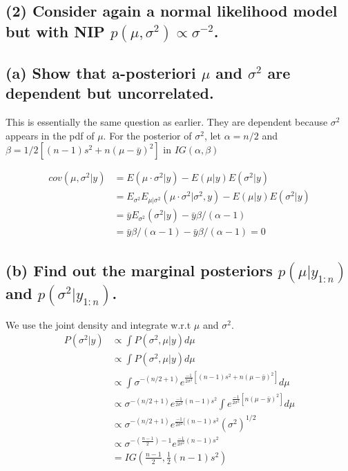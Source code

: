 \documentclass[11pt]{article}
\begin{document}
\subsection*{(2) Consider again a normal likelihood model but with NIP $p(\mu, \sigma^2) \propto \sigma^{-2}$.}



\subsection*{(a) Show that a-posteriori $\mu$ and $\sigma^2$ are dependent but uncorrelated.}



This is essentially the same question as earlier. They are dependent because $\sigma^2$ appears in the pdf of $\mu$. For the posterior of $\sigma^2$, let $\alpha = n/2$ and $\beta = 1/2[(n-1)s^2 + n(\mu - \bar{y})^2]$ in $IG(
\alpha, \beta)$

\begin{align*}
    cov(\mu, \sigma^2|y) &= E(\mu \cdot \sigma^2|y) -  E(\mu|y)E(\sigma^2|y)\\
    &= E_{\sigma^2}E_{\mu|\sigma^2}(\mu \cdot \sigma^2|\sigma^2, y) -  E(\mu|y)E(\sigma^2|y)\\
    &=\bar{y} E_{\sigma^2}  (\sigma^2|y) - \bar{y}\beta/(\alpha - 1)\\
    &= \bar{y}\beta/(\alpha - 1) - \bar{y}\beta/(\alpha - 1) = 0
\end{align*}

\subsection*{(b) Find out the marginal posteriors $p(\mu |y_{1:n})$ and $p(\sigma^2 |y_{1:n})$.}

We use the joint density and integrate w.r.t $\mu$ and $\sigma^2$.
\begin{align*}
    P(\sigma^2|y) &\propto \int P(\sigma^2, \mu|y)d\mu \\
    &\propto \int P(\sigma^2, \mu|y)d\mu \\
    &\propto \int \sigma^{-(n/2 + 1)}e^{\frac{-1}{2\sigma^2}[(n-1)s^2+n(\mu-\bar{y})^2]}d\mu \\
    &\propto \sigma^{-(n/2 + 1)}e^{\frac{-1}{2\sigma^2}(n-1)s^2} \int e^{\frac{-1}{2\sigma^2}[n(\mu-\bar{y})^2]}d\mu \\
     &\propto \sigma^{-(n/2 + 1)}e^{\frac{-1}{2\sigma^2}[(n-1)s^2} (\sigma^2)^{1/2} \\
     &\propto \sigma^{-\left(\frac{n-1}{2}\right)- 1}e^{\frac{-1}{2\sigma^2}(n-1)s^2}\\
     &= IG\left( \frac{n-1}{2}, \frac{1}{2}(n-1)s^2\right)
\end{align*}
\end{document}
